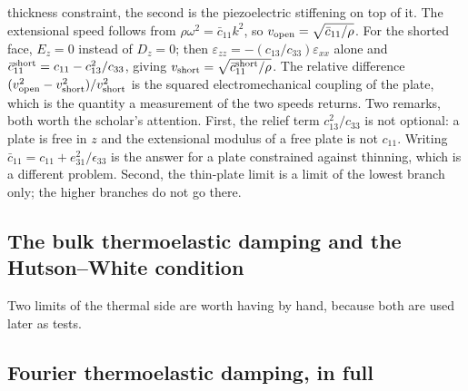 \documentclass[11pt]{article}
\makeatletter
\newif\ifshowworked
\newenvironment{worked}{%
  \ifshowworked\par\smallskip\noindent\textit{Working.}\par\smallskip\else
  \setbox\z@\vbox\bgroup\fi}{\ifshowworked\par\smallskip\else\egroup\fi}
\makeatother
\begin{document}
\begin{worked}
thickness constraint, the second is the piezoelectric stiffening on top of it.
The extensional speed follows from $\rho\omega^2=\bar c_{11}k^2$, so
$v_{\rm open}=\sqrt{\bar c_{11}/\rho}$.
For the shorted face, $E_z=0$ instead of $D_z=0$; then $\varepsilon_{zz}=-(c_{13}/c_{33})\varepsilon_{xx}$
alone and $\bar c_{11}^{\rm short}=c_{11}-c_{13}^2/c_{33}$, giving
$v_{\rm short}=\sqrt{\bar c_{11}^{\rm short}/\rho}$. The relative difference
$(v_{\rm open}^2-v_{\rm short}^2)/v_{\rm short}^2$ is the squared electromechanical coupling of the plate,
which is the quantity a measurement of the two speeds returns.
Two remarks, both worth the scholar's attention. First, the relief term $c_{13}^2/c_{33}$ is not optional:
a plate is free in $z$ and the extensional modulus of a free plate is not $c_{11}$. Writing
$\bar c_{11}=c_{11}+e_{31}^2/\epsilon_{33}$ is the answer for a plate constrained against thinning, which
is a different problem. Second, the thin-plate limit is a limit of the lowest branch only; the higher
branches do not go there.
\end{worked}

\subsection*{The bulk thermoelastic damping and the Hutson--White condition}

Two limits of the thermal side are worth having by hand, because both are used later as tests.

\subsection*{Fourier thermoelastic damping, in full}
\end{document}
